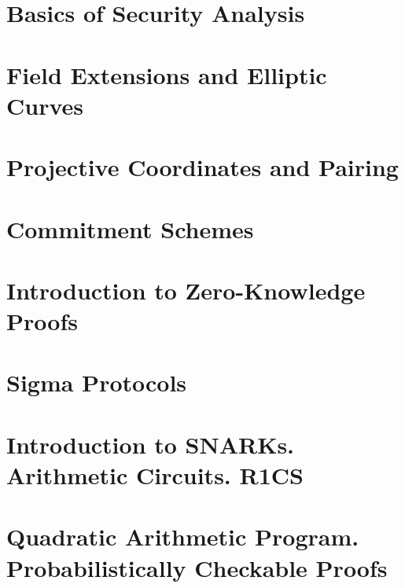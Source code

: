 \documentclass{zkdl-template-105x135-nohead}
\begin{document}
    

    \section{Basics of Security Analysis}\label{section:math-crypto-2}

    

    \section{Field Extensions and Elliptic Curves}

    \label{section:field_extensions}

    \section{Projective Coordinates and Pairing}

    

    \section{Commitment Schemes}

    

    \section{Introduction to Zero-Knowledge Proofs}

    

    \section{Sigma Protocols}

    

    \section{Introduction to SNARKs. Arithmetic Circuits. R1CS}

    \label{section:circuits}

    \section{Quadratic Arithmetic Program. Probabilistically Checkable Proofs}
\end{document}
